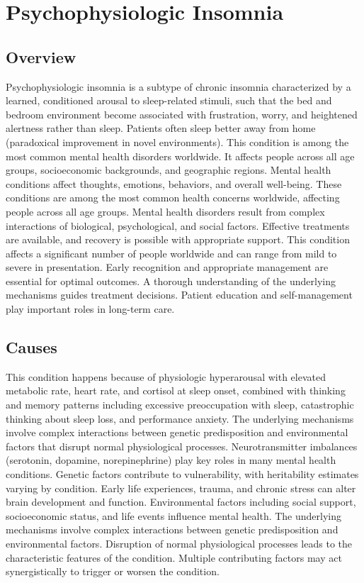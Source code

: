 \chapter{Psychophysiologic Insomnia}
\label{sec:Psychophysiologic Insomnia}

\section{Overview}
Psychophysiologic insomnia is a subtype of chronic insomnia characterized by a learned, conditioned arousal to sleep-related stimuli, such that the bed and bedroom environment become associated with frustration, worry, and heightened alertness rather than sleep. Patients often sleep better away from home (paradoxical improvement in novel environments). This condition is among the most common mental health disorders worldwide. It affects people across all age groups, socioeconomic backgrounds, and geographic regions. Mental health conditions affect thoughts, emotions, behaviors, and overall well-being. These conditions are among the most common health concerns worldwide, affecting people across all age groups. Mental health disorders result from complex interactions of biological, psychological, and social factors. Effective treatments are available, and recovery is possible with appropriate support. This condition affects a significant number of people worldwide and can range from mild to severe in presentation. Early recognition and appropriate management are essential for optimal outcomes. A thorough understanding of the underlying mechanisms guides treatment decisions. Patient education and self-management play important roles in long-term care.
\section{Causes}
This condition happens because of physiologic hyperarousal with elevated metabolic rate, heart rate, and cortisol at sleep onset, combined with thinking and memory patterns including excessive preoccupation with sleep, catastrophic thinking about sleep loss, and performance anxiety. The underlying mechanisms involve complex interactions between genetic predisposition and environmental factors that disrupt normal physiological processes. Neurotransmitter imbalances (serotonin, dopamine, norepinephrine) play key roles in many mental health conditions. Genetic factors contribute to vulnerability, with heritability estimates varying by condition. Early life experiences, trauma, and chronic stress can alter brain development and function. Environmental factors including social support, socioeconomic status, and life events influence mental health. The underlying mechanisms involve complex interactions between genetic predisposition and environmental factors. Disruption of normal physiological processes leads to the characteristic features of the condition. Multiple contributing factors may act synergistically to trigger or worsen the condition.
